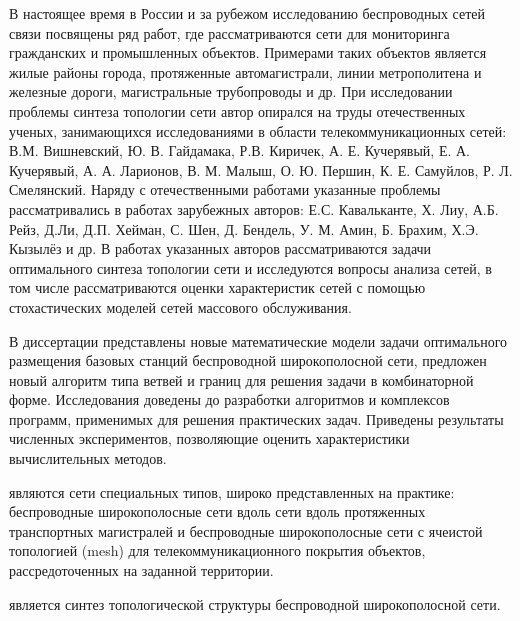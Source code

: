 {\progress} В настоящее время в России и за рубежом исследованию беспроводных сетей связи посвящены ряд работ, где рассматриваются сети для мониторинга гражданских  и промышленных объектов. Примерами таких объектов является жилые районы города, протяженные автомагистрали, линии метрополитена и железные дороги, магистральные трубопроводы и др. При исследовании проблемы синтеза топологии сети автор опирался на труды отечественных ученых, занимающихся исследованиями в области телекоммуникационных сетей: В.М. Вишневский, Ю. В. Гайдамака, Р.В. Киричек, А. Е. Кучерявый, Е. А. Кучерявый, А. А. Ларионов, В. М. Малыш,  О. Ю. Першин, К. Е. Самуйлов, Р. Л. Смелянский. Наряду с отечественными работами указанные проблемы рассматривались в работах зарубежных авторов: Е.С. Кавальканте, Х. Лиу, А.Б. Рейз, Д.Ли, Д.П. Хейман, С. Шен, Д. Бендель, У. М. Амин, Б. Брахим, Х.Э. Кызылёз и др. В работах указанных авторов рассматриваются задачи оптимального синтеза топологии сети и исследуются вопросы анализа сетей, в том числе рассматриваются оценки характеристик сетей с помощью стохастических моделей сетей массового обслуживания. 

В диссертации представлены новые математические модели задачи оптимального размещения базовых станций беспроводной широкополосной сети, предложен новый алгоритм типа ветвей и границ для решения задачи в комбинаторной форме.
Исследования доведены до разработки алгоритмов и комплексов программ, применимых для решения практических задач. Приведены результаты численных экспериментов, позволяющие оценить характеристики вычислительных методов.


{\objectresearch} являются сети специальных типов, широко представленных на практике: беспроводные широкополосные сети вдоль сети вдоль протяженных транспортных магистралей и беспроводные широкополосные сети с ячеистой топологией (mesh) для телекоммуникационного покрытия объектов, рассредоточенных на заданной территории.



{\subjectresearch} является синтез топологической структуры беспроводной широкополосной сети.

